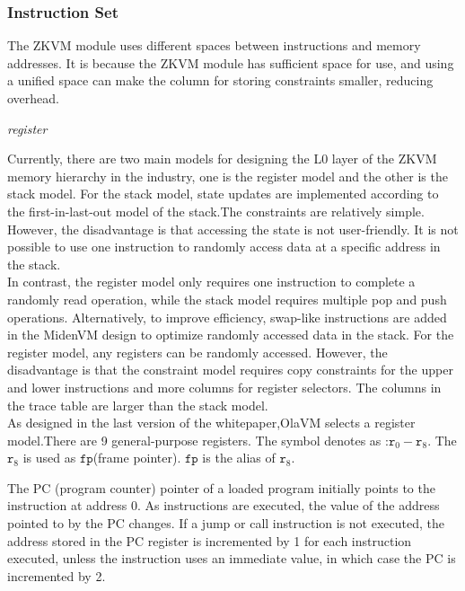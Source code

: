 \subsubsection{Instruction Set} \label{subsec: instructions-set}

The ZKVM module uses different spaces between instructions and memory addresses.
It is because the ZKVM module has sufficient space for use,
and using a unified space can make the column for storing constraints smaller, reducing overhead.


\emph{register} \label{subsubsec: zkvm-executor-register}

    Currently, there are two main models for designing the L0 layer of the ZKVM memory hierarchy in the industry, one is the register model and the other is the stack model.
For the stack model, state updates are implemented according to the first-in-last-out model of the stack.The constraints are relatively simple.
However, the disadvantage is that accessing the state is not user-friendly.
It is not possible to use one instruction to randomly access data at a specific address in the stack. \\
In contrast, the register model only requires one instruction to complete a randomly read operation, while the stack model requires multiple pop and push operations.
Alternatively, to improve efficiency, swap-like instructions are added in the MidenVM design to optimize randomly accessed data in the stack.
For the register model, any registers can be randomly accessed.
However, the disadvantage is that the constraint model requires copy constraints for the upper and lower instructions and more columns for register selectors.
The columns in the trace table are larger than the stack model. \\
    As designed in the last version of the whitepaper,OlaVM selects a register model.There are 9 general-purpose registers.
The symbol denotes as  :$\texttt{r}_0 - \texttt{r}_{8}$.
The $\texttt{r}_{8}$ is used as $\texttt{fp}$(frame pointer). $\texttt{fp}$ is the alias of $\texttt{r}_{8}$.

The PC (program counter) pointer of a loaded program initially points to the instruction at address 0.
As instructions are executed, the value of the address pointed to by the PC changes.
If a jump or call instruction is not executed, the address stored in the PC register is incremented by 1 for each instruction executed, unless the instruction uses an immediate value, in which case the PC is incremented by 2.

